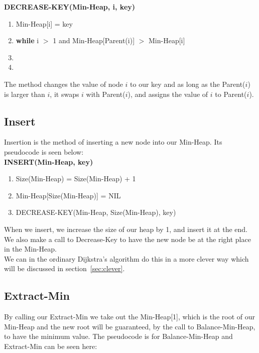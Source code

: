 \documentclass[11pt]{article}
\begin{document}
\textbf{DECREASE-KEY(Min-Heap, i, key)}
\begin{enumerate}
\setlength\itemsep{0em}
\item Min-Heap[i] = key
\item \textbf{while } i $>$ 1 and Min-Heap[Parent(i)] $>$ Min-Heap[i]
\item {}
\item {}
\end{enumerate}

\noindent The method changes the value of node $i$ to our key and as long as the Parent($i$) is larger than $i$, it swaps $i$ with Parent($i$), and assigns the value of $i$ to Parent($i$).\\


\subsection{Insert}
Insertion is the method of inserting a new node into our Min-Heap. Its pseudocode is seen below:\\

\textbf{INSERT(Min-Heap, key)}
\begin{enumerate}
\setlength\itemsep{0em}
\item Size(Min-Heap) = Size(Min-Heap) + 1
\item Min-Heap[Size(Min-Heap)] = NIL
\item DECREASE-KEY(Min-Heap, Size(Min-Heap), key)
\end{enumerate}

\noindent When we insert, we increase the size of our heap by 1, and insert it at the end. We also make a call to Decrease-Key to have the new node be at the right place in the Min-Heap.\\

\noindent We can in the ordinary Dijkstra's algorithm do this in a more clever way which will be discussed in section~\ref{sec:clever}.
\subsection{Extract-Min}
By calling our Extract-Min we take out the Min-Heap[1], which is the root of our Min-Heap and the new root will be guaranteed, by the call to Balance-Min-Heap, to have the minimum value. The pseudocode is for Balance-Min-Heap and Extract-Min can be seen here:\\
\end{document}

